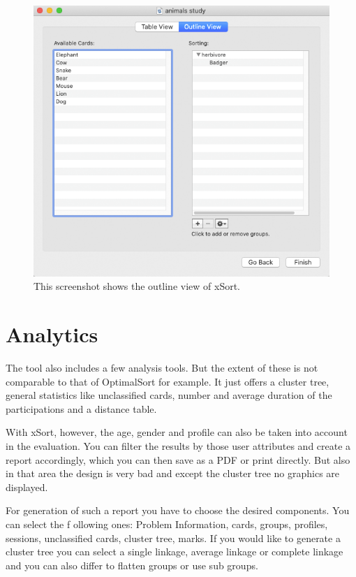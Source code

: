 \begin{figure}[tp] 
\centering
\includegraphics[keepaspectratio,width=460px]{images/xsort-outlineview.png}
\caption[xSort Outline View] { This screenshot shows the outline view of xSort.
 }
\label{fig:xSort-outlineview}
\end{figure}

\section{Analytics}
The tool also includes a few analysis tools. But the extent of these is not comparable to that of 
OptimalSort for example. It just offers a cluster tree, general statistics like unclassified cards, 
number and average duration of the participations and a distance table.  

With xSort, however, the age, gender and profile can also be taken into account in the evaluation. 
You can filter the results by those user attributes and create a report accordingly, which you can 
then save as a PDF or print directly. But also in that area the design is very bad and except the 
cluster tree no graphics are displayed.

For generation of such a report you have to choose the desired components. You can select the f
ollowing ones: Problem Information, cards, groups, profiles, sessions, unclassified cards, cluster 
tree, marks. If you would like to generate a cluster tree you can select a single linkage, average 
linkage or complete linkage and you can also differ to flatten groups or use sub groups.

